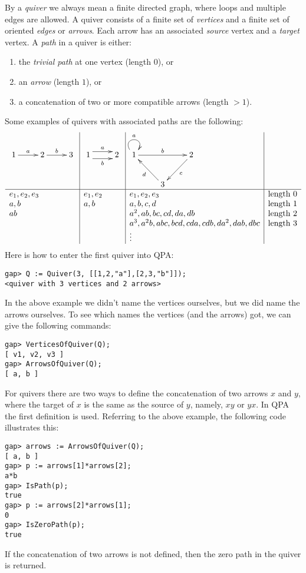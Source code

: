 \documentclass{amsart}
\theoremstyle{definition}
\theoremstyle{theoretic}
\begin{document}
By a \emph{quiver} we always mean a finite directed graph, where loops
and multiple edges are allowed.  A quiver consists of a finite set of
\emph{vertices} and a finite set of oriented \emph{edges} or
\emph{arrows}.  Each arrow has an associated \emph{source} vertex and
a \emph{target} vertex.  A \emph{path} in a quiver is either:
\begin{enumerate}[\rm(i)]
\item the \emph{trivial path} at one vertex (length $0$), or
\item an \emph{arrow} (length $1$), or 
\item a concatenation of two or more compatible arrows (length $> 1$).
\end{enumerate}  
Some examples of quivers with associated paths are the following:
\[\begin{array}{l|l|l|l}
\xymatrix{1\ar[r]^a & 2\ar[r]^b & 3}  &
\xymatrix{1\ar@<1ex>[r]^a\ar@<-1ex>[r]_b & 2} & 
\xymatrix{1\ar@(ul,ur)^a\ar[rr]^b & & 2\ar[dl]^c \\ & 3\ar[ul]^d & } &
\\ \hline
e_1, e_2, e_3 & e_1, e_2 & e_1, e_2, e_3 & \textrm{length 0}\\
a, b & a, b & a, b, c, d & \textrm{length 1}\\
ab & & a^2, ab, bc, cd, da, db & \textrm{length 2}\\
& & a^3, a^2b, abc, bcd, cda, cdb, da^2, dab, dbc & \textrm{length 3}\\
& & \vdots & 
\end{array}\]
Here is how to enter the first quiver into QPA:
\begin{verbatim}
gap> Q := Quiver(3, [[1,2,"a"],[2,3,"b"]]); 
<quiver with 3 vertices and 2 arrows>
\end{verbatim} 
In the above example we didn't name the vertices ourselves, but we did
name the arrows ourselves.  To see which names the vertices (and the
arrows) got, we can give the following commands:
\begin{verbatim}
gap> VerticesOfQuiver(Q);
[ v1, v2, v3 ]
gap> ArrowsOfQuiver(Q);
[ a, b ]
\end{verbatim}
For quivers there are two ways to define the concatenation of two
arrows $x$ and $y$, where the target of $x$ is the same as the source of
$y$, namely, $xy$ or $yx$.  In QPA the first definition is used.
Referring to the above example, the following code illustrates this:
\begin{verbatim}
gap> arrows := ArrowsOfQuiver(Q);
[ a, b ]
gap> p := arrows[1]*arrows[2];
a*b
gap> IsPath(p);
true
gap> p := arrows[2]*arrows[1];
0
gap> IsZeroPath(p);
true
\end{verbatim}
If the concatenation of two arrows is not defined, then the zero path
in the quiver is returned.  
\end{document}
